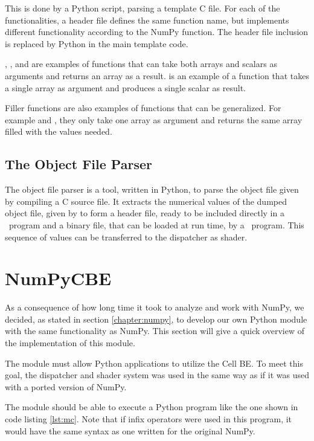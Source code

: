 This is done by a Python script, parsing a template C file. For each
of the functionalities, a header file defines the same function name,
but implements different functionality according to the NumPy
function. The header file inclusion is replaced by Python in the main
template code.

, ,  and
 are examples of functions that can take both
arrays and scalars as arguments and returns an array as a
result.  is an example of a function that takes a single
array as argument and produces a single scalar as result. 

Filler functions are also examples of functions that can be
generalized. For example  and , they
only take one array as argument and returns the same array filled with
the values needed. 

\subsection{The Object File Parser}
\label{sec:oparser}

The object file parser is a tool, written in Python, to parse the
object file given by compiling a C source file. It extracts the
numerical values of the dumped object file, given by
 to form a header file, ready to be included
directly in a \CBE\ program and a binary file, that can be loaded at
run time, by a \CBE\ program. This sequence of values can be
transferred to the dispatcher as shader.

\section{NumPyCBE}

As a consequence of how long time it took to analyze and work with
NumPy, we decided, as stated in section \ref{chapter:numpy}, to
develop our own Python module with the same functionality as
NumPy. This section will give a quick overview of the implementation
of this module.

The module must allow Python applications to utilize the Cell BE. To
meet this goal, the dispatcher and shader system was used in the same
way as if it was used with a ported version of NumPy.

The module should be able to execute a Python program like the one
shown in code listing \ref{lst:mc}. Note that if infix operators were
used in this program, it would have the same syntax as one written for
the original NumPy.

